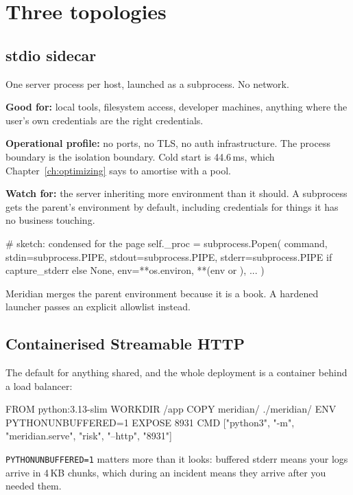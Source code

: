 \section{Three topologies}

\subsection{stdio sidecar}

One server process per host, launched as a subprocess. No network.

\textbf{Good for:} local tools, filesystem access, developer machines, anything
where the user's own credentials are the right credentials.

\textbf{Operational profile:} no ports, no TLS, no auth infrastructure. The
process boundary is the isolation boundary. Cold start is 44.6\,ms, which
Chapter~\ref{ch:optimizing} says to amortise with a pool.

\textbf{Watch for:} the server inheriting more environment than it should. A
subprocess gets the parent's environment by default, including credentials for
things it has no business touching.

\begin{py}
# sketch: condensed for the page
self._proc = subprocess.Popen(
    command,
    stdin=subprocess.PIPE, stdout=subprocess.PIPE,
    stderr=subprocess.PIPE if capture_stderr else None,
    env={**os.environ, **(env or {})},
    ...
)
\end{py}

Meridian merges the parent environment because it is a book. A hardened launcher
passes an explicit allowlist instead.

\subsection{Containerised Streamable HTTP}

The default for anything shared, and the whole deployment is a container behind
a load balancer:

\begin{py}
FROM python:3.13-slim
WORKDIR /app
COPY meridian/ ./meridian/
ENV PYTHONUNBUFFERED=1
EXPOSE 8931
CMD ["python3", "-m", "meridian.serve", "risk", "--http", "8931"]
\end{py}

\texttt{PYTHONUNBUFFERED=1} matters more than it looks: buffered stderr means
your logs arrive in 4\,KB chunks, which during an incident means they arrive
after you needed them.

